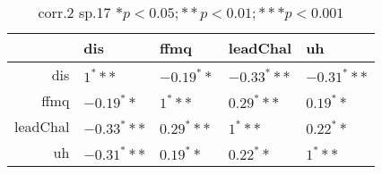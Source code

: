 \begin{table}[ht]
\centering
\begin{tabular}{rllll}
  \hline
 & dis & ffmq & leadChal & uh \\ 
  \hline
dis & $1^***$ & $-0.19^**$ & $-0.33^***$ & $-0.31^***$ \\ 
  ffmq & $-0.19^**$ & $1^***$ & $0.29^***$ & $0.19^**$ \\ 
  leadChal & $-0.33^***$ & $0.29^***$ & $1^***$ & $0.22^**$ \\ 
  uh & $-0.31^***$ & $0.19^**$ & $0.22^**$ & $1^***$ \\ 
   \hline
\end{tabular}
\caption{corr.2 sp.17 $* p < 0.05; ** p < 0.01; *** p < 0.001$} 
\end{table}
